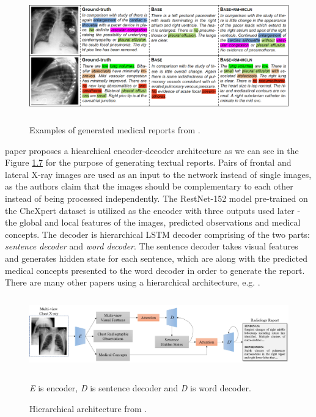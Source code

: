 \begin{figure}[h]\centering
\includegraphics[width=145mm, height=57mm]{../img/ZhihongExample}
\caption{Examples of generated medical reports from \citet{chen2020generating}.}
\label{fig06:ZhihongExample}
\end{figure}

\citet{yuan2019automatic} paper proposes a hiearchical encoder-decoder architecture as we can see in the Figure \hyperref[fig07:YuanExample]{1.7} for the purpose of generating textual reports. Pairs of frontal and lateral X-ray images are used as an input to the network instead of single images, as the authors claim that the images should be complementary to each other instead of being processed independently. The RestNet-152 model pre-trained on the CheXpert\citep{irvin2019chexpert} dataset is utilized as the encoder with three outputs used later - the global and local features of the images, predicted observations and medical concepts. The decoder is hierarchical LSTM decoder comprising of the two parts: \textit{sentence decoder} and \textit{word decoder}. The sentence decoder takes visual features and generates hidden state for each sentence, which are along with the predicted medical concepts presented to the word decoder in order to generate the report. There are many other papers using a hierarchical architecture, e.g. \citet{huang2019multi}. \\

\begin{figure}[h]\centering
\includegraphics[width=145mm, height=32mm]{../img/YuanExample}
\caption{Hierarchical architecture from \citet{yuan2019automatic}.}
\label{fig07:YuanExample}

\textit{E} is encoder, \textit{D} is sentence decoder and \textit{D\textquotesingle} is word decoder.
\end{figure}

